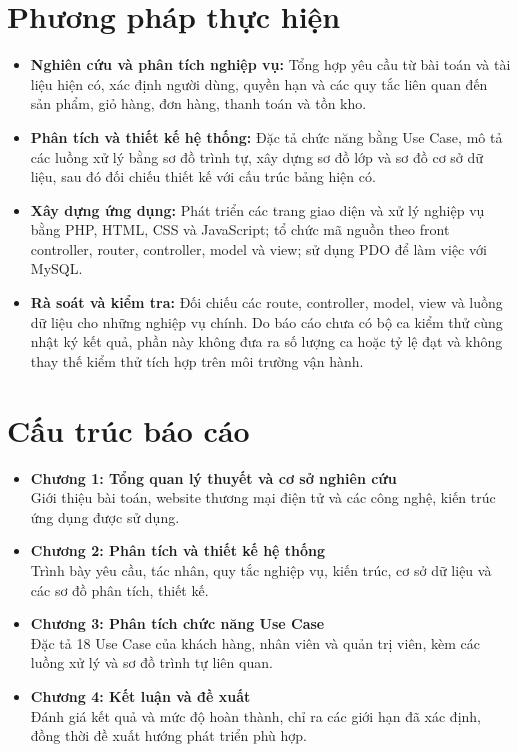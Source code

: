 \section{Phương pháp thực hiện}
\begin{itemize}
    \item \textbf{Nghiên cứu và phân tích nghiệp vụ:} Tổng hợp yêu cầu từ bài toán và tài liệu hiện có, xác định người dùng, quyền hạn và các quy tắc liên quan đến sản phẩm, giỏ hàng, đơn hàng, thanh toán và tồn kho.
    \item \textbf{Phân tích và thiết kế hệ thống:} Đặc tả chức năng bằng Use Case, mô tả các luồng xử lý bằng sơ đồ trình tự, xây dựng sơ đồ lớp và sơ đồ cơ sở dữ liệu, sau đó đối chiếu thiết kế với cấu trúc bảng hiện có.
    \item \textbf{Xây dựng ứng dụng:} Phát triển các trang giao diện và xử lý nghiệp vụ bằng PHP, HTML, CSS và JavaScript; tổ chức mã nguồn theo front controller, router, controller, model và view; sử dụng PDO để làm việc với MySQL.
    \item \textbf{Rà soát và kiểm tra:} Đối chiếu các route, controller, model, view và luồng dữ liệu cho những nghiệp vụ chính. Do báo cáo chưa có bộ ca kiểm thử cùng nhật ký kết quả, phần này không đưa ra số lượng ca hoặc tỷ lệ đạt và không thay thế kiểm thử tích hợp trên môi trường vận hành.
\end{itemize}


\section{Cấu trúc báo cáo}
\begin{itemize}
    \item \textbf{Chương 1: Tổng quan lý thuyết và cơ sở nghiên cứu} \\
    Giới thiệu bài toán, website thương mại điện tử và các công nghệ, kiến trúc ứng dụng được sử dụng.
    
    \item \textbf{Chương 2: Phân tích và thiết kế hệ thống} \\
    Trình bày yêu cầu, tác nhân, quy tắc nghiệp vụ, kiến trúc, cơ sở dữ liệu và các sơ đồ phân tích, thiết kế.
    
    \item \textbf{Chương 3: Phân tích chức năng Use Case} \\
    Đặc tả 18 Use Case của khách hàng, nhân viên và quản trị viên, kèm các luồng xử lý và sơ đồ trình tự liên quan.
    
    \item \textbf{Chương 4: Kết luận và đề xuất} \\
    Đánh giá kết quả và mức độ hoàn thành, chỉ ra các giới hạn đã xác định, đồng thời đề xuất hướng phát triển phù hợp.
\end{itemize}
